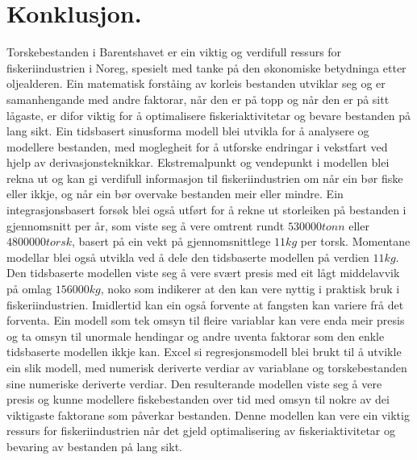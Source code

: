 \documentclass{report}
\begin{document}
\chapter{Konklusjon.}
Torskebestanden i Barentshavet er ein viktig og verdifull ressurs for fiskeriindustrien i Noreg, spesielt med tanke på den økonomiske betydninga etter oljealderen. Ein matematisk forståing av korleis bestanden utviklar seg og er samanhengande med andre faktorar, når den er på topp og når den er på sitt lågaste, er difor viktig for å optimalisere fiskeriaktivitetar og bevare bestanden på lang sikt. Ein tidsbasert sinusforma modell blei utvikla for å analysere og modellere bestanden, med moglegheit for å utforske endringar i vekstfart ved hjelp av derivasjonsteknikkar. Ekstremalpunkt og vendepunkt i modellen blei rekna ut og kan gi verdifull informasjon til fiskeriindustrien om når ein bør fiske eller ikkje, og når ein bør overvake bestanden meir eller mindre.
Ein integrasjonsbasert forsøk blei også utført for å rekne ut storleiken på bestanden i gjennomsnitt per år, som viste seg å vere omtrent rundt $530000 tonn$ eller $4800000 torsk$, basert på ein vekt på gjennomsnittlege $11kg$ per torsk. Momentane modellar blei også utvikla ved å dele den tidsbaserte modellen på verdien $11kg$. Den tidsbaserte modellen viste seg å vere svært presis med eit lågt middelavvik på omlag $156000kg$, noko som indikerer at den kan vere nyttig i praktisk bruk i fiskeriindustrien. Imidlertid kan ein også forvente at fangsten kan variere frå det forventa.
Ein modell som tek omsyn til fleire variablar kan vere enda meir presis og ta omsyn til unormale hendingar og andre uventa faktorar som den enkle tidsbaserte modellen ikkje kan. Excel si regresjonsmodell blei brukt til å utvikle ein slik modell, med numerisk deriverte verdiar av variablane og torskebestanden sine numeriske deriverte verdiar. Den resulterande modellen viste seg å vere presis og kunne modellere fiskebestanden over tid med omsyn til nokre av dei viktigaste faktorane som påverkar bestanden. Denne modellen kan vere ein viktig ressurs for fiskeriindustrien når det gjeld optimalisering av fiskeriaktivitetar og bevaring av bestanden på lang sikt.
\end{document}
